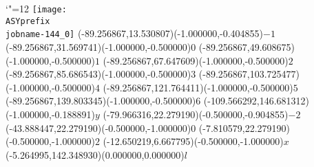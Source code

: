 \setlength{\unitlength}{1pt}%
\makeatletter%
\let\ASYencoding\f@encoding%
\let\ASYfamily\f@family%
\let\ASYseries\f@series%
\let\ASYshape\f@shape%
\makeatother%
{\catcode`"=12%
\texttt{[image: \\ASYprefix\\jobname-144\_0]}%
}%
\color{ASYcolor}%
\fontsize{12.000000}{14.400000}\selectfont%
\usefont{\ASYencoding}{\ASYfamily}{\ASYseries}{\ASYshape}%
\ASYalign(-89.256867,13.530807)(-1.000000,-0.404855){\vphantom{$10^4$}$-1$}%
\color{ASYcolor}%
\fontsize{12.000000}{14.400000}\selectfont%
\ASYalign(-89.256867,31.569741)(-1.000000,-0.500000){\vphantom{$10^4$}$0$}%
\color{ASYcolor}%
\fontsize{12.000000}{14.400000}\selectfont%
\ASYalign(-89.256867,49.608675)(-1.000000,-0.500000){\vphantom{$10^4$}$1$}%
\color{ASYcolor}%
\fontsize{12.000000}{14.400000}\selectfont%
\ASYalign(-89.256867,67.647609)(-1.000000,-0.500000){\vphantom{$10^4$}$2$}%
\color{ASYcolor}%
\fontsize{12.000000}{14.400000}\selectfont%
\ASYalign(-89.256867,85.686543)(-1.000000,-0.500000){\vphantom{$10^4$}$3$}%
\color{ASYcolor}%
\fontsize{12.000000}{14.400000}\selectfont%
\ASYalign(-89.256867,103.725477)(-1.000000,-0.500000){\vphantom{$10^4$}$4$}%
\color{ASYcolor}%
\fontsize{12.000000}{14.400000}\selectfont%
\ASYalign(-89.256867,121.764411)(-1.000000,-0.500000){\vphantom{$10^4$}$5$}%
\color{ASYcolor}%
\fontsize{12.000000}{14.400000}\selectfont%
\ASYalign(-89.256867,139.803345)(-1.000000,-0.500000){\vphantom{$10^4$}$6$}%
\color{ASYcolor}%
\fontsize{12.000000}{14.400000}\selectfont%
\ASYalign(-109.566292,146.681312)(-1.000000,-0.188891){$y$}%
\color{ASYcolor}%
\fontsize{12.000000}{14.400000}\selectfont%
\ASYalign(-79.966316,22.279190)(-0.500000,-0.904855){\vphantom{$10^4$}$-2$}%
\color{ASYcolor}%
\fontsize{12.000000}{14.400000}\selectfont%
\ASYalign(-43.888447,22.279190)(-0.500000,-1.000000){\vphantom{$10^4$}$0$}%
\color{ASYcolor}%
\fontsize{12.000000}{14.400000}\selectfont%
\ASYalign(-7.810579,22.279190)(-0.500000,-1.000000){\vphantom{$10^4$}$2$}%
\color{ASYcolor}%
\fontsize{12.000000}{14.400000}\selectfont%
\ASYalign(-12.650219,6.667795)(-0.500000,-1.000000){$x$}%
\color{ASYcolor}%
\fontsize{12.000000}{14.400000}\selectfont%
\ASYalign(-5.264995,142.348930)(0.000000,0.000000){$l$}%
